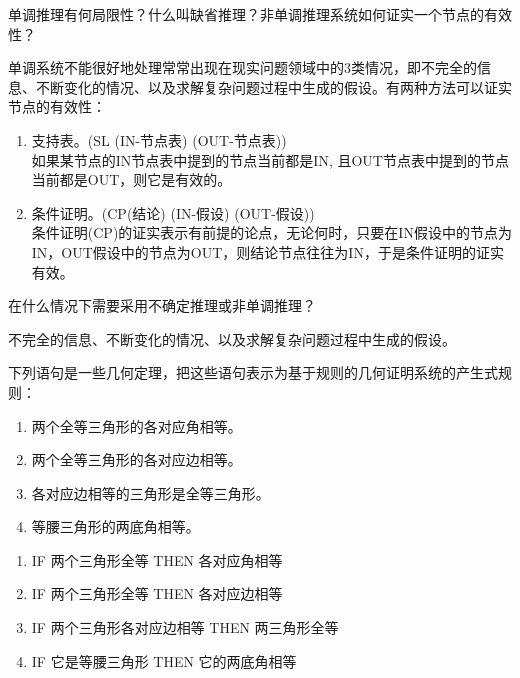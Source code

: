 \begin{question}
单调推理有何局限性？什么叫缺省推理？非单调推理系统如何证实一个节点的有效性？
\end{question}
\begin{solution}
单调系统不能很好地处理常常出现在现实问题领域中的3类情况，即不完全的信息、不断变化的情况、以及求解复杂问题过程中生成的假设。有两种方法可以证实节点的有效性：
	\begin{enumerate}
		\item 支持表。(SL (IN-节点表) (OUT-节点表)) \\
			如果某节点的IN节点表中提到的节点当前都是IN, 且OUT节点表中提到的节点当前都是OUT，则它是有效的。
		\item 条件证明。(CP(结论) (IN-假设) (OUT-假设)) \\
			条件证明(CP)的证实表示有前提的论点，无论何时，只要在IN假设中的节点为IN，OUT假设中的节点为OUT，则结论节点往往为IN，于是条件证明的证实有效。 
	\end{enumerate}
\end{solution}

\begin{question}
在什么情况下需要采用不确定推理或非单调推理？
\end{question}
\begin{solution}
不完全的信息、不断变化的情况、以及求解复杂问题过程中生成的假设。
\end{solution}

\begin{question}
下列语句是一些几何定理，把这些语句表示为基于规则的几何证明系统的产生式规则：
	\begin{enumerate}
		\item 两个全等三角形的各对应角相等。
		\item 两个全等三角形的各对应边相等。 
		\item 各对应边相等的三角形是全等三角形。
		\item 等腰三角形的两底角相等。 
	\end{enumerate}
\end{question}
\begin{solution}
	\begin{enumerate}
		\item IF 两个三角形全等 THEN 各对应角相等 
		\item IF 两个三角形全等 THEN 各对应边相等 
		\item IF 两个三角形各对应边相等 THEN 两三角形全等 
		\item IF 它是等腰三角形 THEN 它的两底角相等
	\end{enumerate}

\end{solution}